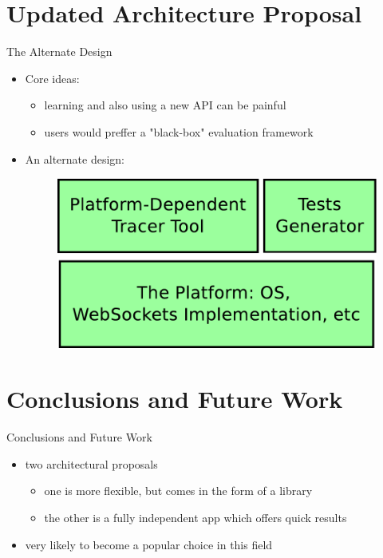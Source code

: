 \documentclass{soa.cs.pub.ro}
\begin{document}
\section{Updated Architecture Proposal}

\begin{frame}{The Alternate Design}
  \begin{itemize}
    \item Core ideas:
      \begin{itemize}
        \item learning and also using a new API can be painful
        \item users would preffer a "black-box" evaluation framework
      \end{itemize}
    \item An alternate design:
      \begin{figure}
         \includegraphics[scale=0.25]{img/architecture2.pdf}
      \end{figure}
  \end{itemize}
\end{frame}

\section{Conclusions and Future Work}

\begin{frame}{Conclusions and Future Work}
  \begin{itemize}
    \item two architectural proposals
      \begin{itemize}
        \item one is more flexible, but comes in the form of a library
        \item the other is a fully independent app which offers quick results
      \end{itemize}
    \item very likely to become a popular choice in this field
  \end{itemize}
\end{frame}
\end{document}

